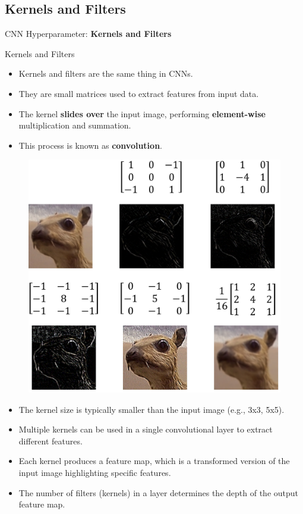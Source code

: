 \subsection{Kernels and Filters}
\begin{frame}{}
    \LARGE CNN Hyperparameter: \textbf{Kernels and Filters}
\end{frame}

\begin{frame}[allowframebreaks]{Kernels and Filters}
    \begin{itemize}
        \item Kernels and filters are the same thing in CNNs.
        \item They are small matrices used to extract features from input data.
        \item The kernel \textbf{slides over} the input image, performing \textbf{element-wise} multiplication and summation.
        \item This process is known as \textbf{convolution}.
    \end{itemize}

    \framebreak

    \begin{figure}
        \centering
        \includegraphics[width=1.0\textwidth,height=0.9\textheight,keepaspectratio]{images/cnn/conv_12.png}
    \end{figure}

    \framebreak
    \begin{itemize}
        \item The kernel size is typically smaller than the input image (e.g., 3x3, 5x5).
        \item Multiple kernels can be used in a single convolutional layer to extract different features.
        \item Each kernel produces a feature map, which is a transformed version of the input image highlighting specific features.
        \item The number of filters (kernels) in a layer determines the depth of the output feature map.
    \end{itemize}
\end{frame}
